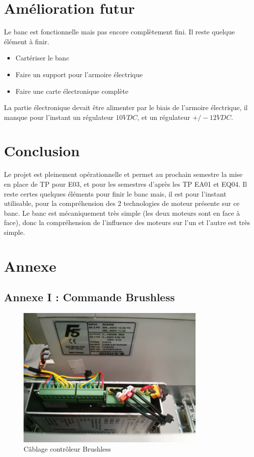 \documentclass[11pt]{article}
\begin{document}
\section{Amélioration futur}

Le banc est fonctionnelle mais pas encore complètement fini. Il reste quelque élément à finir.

\begin{itemize}
	\item Cartériser le banc
	\item Faire un support pour l'armoire électrique
	\item Faire une carte électronique complète
\end{itemize}

La partie électronique devait être alimenter par le biais de l'armoire électrique, il manque pour l'instant un régulateur $10VDC$, et un régulateur $+/- 12VDC$.

\newpage
\section{Conclusion}

Le projet est pleinement opérationnelle et permet au prochain semestre la mise en place de TP pour E03, et pour les semestres d'après les TP EA01 et EQ04. Il reste certes quelques éléments pour finir le banc mais, il est pour l'instant utilisable, pour la compréhension des 2 technologies de moteur présente sur ce banc. Le banc est mécaniquement très simple (les deux moteurs sont en face à face), donc la compréhension de l'influence des moteurs sur l'un et l'autre est très simple. 


\newpage
\section{Annexe}

\subsection{Annexe I : Commande Brushless}

\begin{figure}[!h]
    \centering
    \includegraphics[width=350px]{IMG_20160629_193653.jpg}
    \caption{Câblage contrôleur Brushless}
\end{figure}
\end{document}
